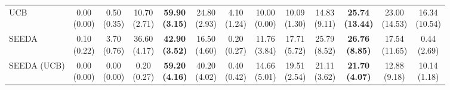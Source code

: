\begin{table}[H]
{\begin{tabular}{l|cccccc|cccccc}
UCB & \makecell{0.00 \\ (0.00)} & \makecell{0.50 \\ (0.35)} & {\cellcolor[HTML]{C8E6C9}} \makecell{10.70 \\ (2.71)} & \bfseries \makecell{59.90 \\ (3.15)} & \makecell{24.80 \\ (2.93)} & \makecell{4.10 \\ (1.24)} & \makecell{10.00 \\ (0.00)} & \makecell{10.09 \\ (1.30)} & {\cellcolor[HTML]{C8E6C9}} \makecell{14.83 \\ (9.11)} & \bfseries \makecell{25.74 \\ (13.44)} & \makecell{23.00 \\ (14.53)} & \makecell{16.34 \\ (10.54)} \\
SEEDA & \makecell{0.10 \\ (0.22)} & \makecell{3.70 \\ (0.76)} & {\cellcolor[HTML]{C8E6C9}} \makecell{36.60 \\ (4.17)} & \bfseries \makecell{42.90 \\ (3.52)} & \makecell{16.50 \\ (4.60)} & \makecell{0.20 \\ (0.27)} & \makecell{11.76 \\ (3.84)} & \makecell{17.71 \\ (5.72)} & {\cellcolor[HTML]{C8E6C9}} \makecell{25.79 \\ (8.52)} & \bfseries \makecell{26.76 \\ (8.85)} & \makecell{17.54 \\ (11.65)} & \makecell{0.44 \\ (2.69)} \\
SEEDA (UCB) & \makecell{0.00 \\ (0.00)} & \makecell{0.00 \\ (0.00)} & {\cellcolor[HTML]{C8E6C9}} \makecell{0.20 \\ (0.27)} & \bfseries \makecell{59.20 \\ (4.16)} & \makecell{40.20 \\ (4.02)} & \makecell{0.40 \\ (0.42)} & \makecell{14.66 \\ (5.01)} & \makecell{19.51 \\ (2.54)} & {\cellcolor[HTML]{C8E6C9}} \makecell{21.11 \\ (3.62)} & \bfseries \makecell{21.70 \\ (4.07)} & \makecell{12.88 \\ (9.18)} & \makecell{10.14 \\ (1.18)} \\

\end{tabular}}
\end{table}
